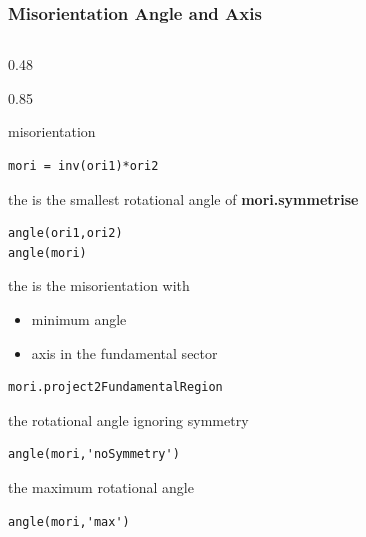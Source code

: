\documentclass[compress,aspectratio=1610,fleqn]{beamer}
\begin{document}
\begin{frame}[fragile]
  \frametitle{Misorientation Angle and Axis}

    \begin{columns}
    \begin{column}{0.48\textwidth}
      \begin{overlayarea}{\textwidth}{0.85\textheight}

        misorientation \vspace{-0.2cm}
        \begin{lstlisting}[style=input]
mori = inv(ori1)*ori2
    \end{lstlisting}

  \pause
  \medskip

  the  is the smallest rotational angle of
  \textbf{mori.symmetrise}

    \vspace{-0.2cm}
    \begin{lstlisting}[style=input]
angle(ori1,ori2)
angle(mori)
    \end{lstlisting}

    \pause
  \medskip

  the  is the misorientation with
  \begin{itemize}
  \item minimum angle
  \item axis in the fundamental sector
  \end{itemize}
    \vspace{-0.2cm}
    \begin{lstlisting}[style=input]
mori.project2FundamentalRegion
    \end{lstlisting}

      \pause
  \medskip

  the rotational angle ignoring symmetry
    \vspace{-0.2cm}
    \begin{lstlisting}[style=input]
angle(mori,'noSymmetry')
    \end{lstlisting}

    \pause

    the maximum rotational angle
    \vspace{-0.2cm}
    \begin{lstlisting}[style=input]
angle(mori,'max')
    \end{lstlisting}
    


\end{overlayarea}
\end{column}
\end{columns}
\end{frame}
\end{document}
